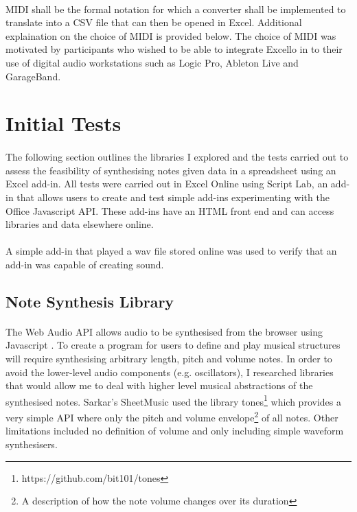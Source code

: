 \paragraph{} MIDI shall be the formal notation for which a converter shall be implemented to translate into a CSV file that can then be opened in Excel. Additional explaination on the choice of MIDI is provided below. The choice of MIDI was motivated by participants who wished to be able to integrate Excello in to their use of digital audio workstations such as Logic Pro, Ableton Live and GarageBand.

\section{Initial Tests}

\paragraph{} The following section outlines the libraries I explored and the tests carried out to assess the feasibility of synthesising notes given data in a spreadsheet using an Excel add-in. All tests were carried out in Excel Online using Script Lab, an add-in that allows users to create and test simple add-ins experimenting with the Office Javascript API. These add-ins have an HTML front end and can access libraries and data elsewhere online.

\paragraph{} A simple add-in that played a wav file stored online was used to verify that an add-in was capable of creating sound.

\subsection{Note Synthesis Library}

\paragraph{} The Web Audio API allows audio to be synthesised from the browser using Javascript \cite{mozilla:webaudioapi}. To create a program for users to define and play musical structures will require synthesising arbitrary length, pitch and volume notes. In order to avoid the lower-level audio components (e.g. oscillators), I researched libraries that would allow me to deal with higher level musical abstractions of the synthesised notes. Sarkar's SheetMusic used the library tones\footnote{https://github.com/bit101/tones} which provides a very simple API where only the pitch and volume envelope\footnote{A description of how the note volume changes over its duration} of all notes. Other limitations included no definition of volume and only including simple waveform synthesisers.


